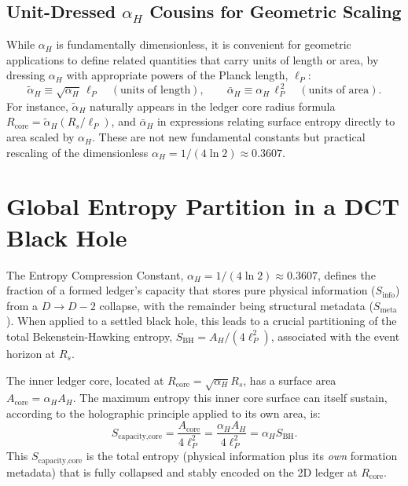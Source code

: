 \documentclass[a4paper, 12pt, oneside]{book}
\numberwithin{equation}{chapter}
\begin{document}
\subsection{Unit-Dressed \texorpdfstring{$\alpha_H$}{alphaH} Cousins for Geometric Scaling}

While $\alpha_H$ is fundamentally dimensionless, it is convenient for geometric applications to define related quantities that carry units of length or area, by dressing $\alpha_H$ with appropriate powers of the Planck length, $\ell_P$:
\[
    \tilde\alpha_H \equiv \sqrt{\alpha_H}\,\ell_P \quad (\text{units of length}),
    \qquad
    \bar\alpha_H \equiv \alpha_H\,\ell_P^{\,2} \quad (\text{units of area}).
\]
For instance, $\tilde\alpha_H$ naturally appears in the ledger core radius formula $R_{\text{core}} = \tilde\alpha_H (R_s/\ell_P)$, and $\bar\alpha_H$ in expressions relating surface entropy directly to area scaled by $\alpha_H$. These are not new fundamental constants but practical rescaling of the dimensionless $\alpha_H = 1/(4\ln 2) \approx 0.3607$.

\section[Entropy Partition in a Black Hole]{Global Entropy Partition in a DCT Black Hole}
\label{sec:GlobalEntropyPartition}

The Entropy Compression Constant, $\alpha_H = 1/(4\ln 2) \approx 0.3607$, defines the fraction of a formed ledger's capacity that stores pure physical information ($S_{\text{info}}$) from a $D \rightarrow D-2$ collapse, with the remainder being structural metadata ($S_{\text{meta}}$). When applied to a settled black hole, this leads to a crucial partitioning of the total Bekenstein-Hawking entropy, $S_{\text{BH}} = A_H/(4\ell_P^2)$, associated with the event horizon at $R_s$.

The inner ledger core, located at $R_{\text{core}} = \sqrt{\alpha_H}R_s$, has a surface area $A_{\text{core}} = \alpha_H A_H$. The maximum entropy this inner core surface can itself sustain, according to the holographic principle applied to its own area, is:
\[
S_{\text{capacity,core}} = \frac{A_{\text{core}}}{4\ell_P^2} = \frac{\alpha_H A_H}{4\ell_P^2} = \alpha_H S_{\text{BH}}.
\]
This $S_{\text{capacity,core}}$ is the total entropy (physical information plus its \emph{own} formation metadata) that is fully collapsed and stably encoded on the 2D ledger at $R_{\text{core}}$.
\end{document}
